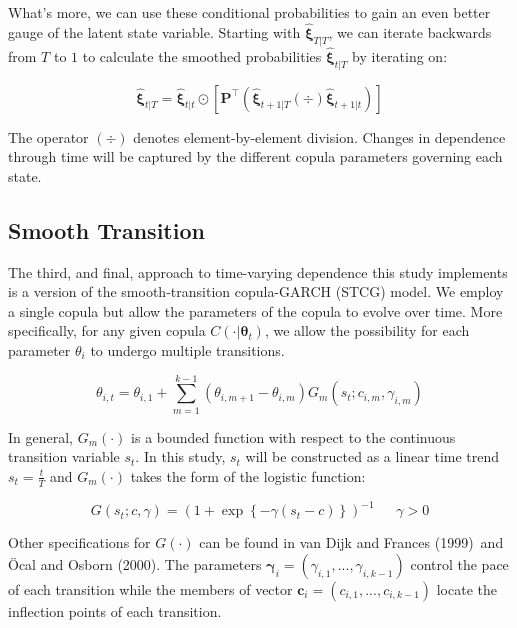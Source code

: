 \documentclass[12pt]{article}
\newcommand{\boldXi}{\hat{\boldsymbol{\xi}}}
\begin{document}
What's more, we can use these conditional probabilities to gain an even better gauge of the latent state variable. Starting with $\boldXi_{T|T}$, we can iterate backwards from $T$ to $1$ to calculate the smoothed probabilities $\boldXi_{t|T}$ by iterating on:

\begin{equation}
\boldXi_{t|T} = \boldXi_{t|t} \odot \left[\mathbf{P}^{\top}\left(\boldXi_{t+1|T}\left(\div\right)\boldXi_{t+1|t}\right)\right]
\end{equation}

The operator $\left(\div\right)$ denotes element-by-element division. Changes in dependence through time will be captured by the different copula parameters governing each state.

\subsection{Smooth Transition}

The third, and final, approach to time-varying dependence this study implements is a version of the smooth-transition copula-GARCH (STCG) model. We employ a single copula but allow the parameters of the copula to evolve over time. More specifically, for any given copula $C\left(\cdot | \mathbf{\theta}_{t}\right)$, we allow the possibility for each parameter $\theta
_{i}$ to undergo multiple transitions.

\begin{equation} \label{eqn:smoothTrans}
\theta_{i,t} = \theta_{i,1} + \sum_{m=1}^{k-1}\left(\theta_{i,m+1} - \theta_{i,m}\right) G_{m}\left(s_{t}; c_{i,m},\gamma_{i,m}\right)
\end{equation}

In general, $G_{m}\left(\cdot\right)$ is a bounded function with respect to the continuous transition variable $s_{t}$. In this study, $s_{t}$ will be constructed as a linear time trend $s_{t}=\frac{t}{T}$ and $G_{m}\left(\cdot\right)$ takes the form of the logistic function:

\begin{equation} \label{eqn:smoothTransLogit}
G\left(s_{t}; c, \gamma\right) = \left(1+\exp\left\{ -\gamma \left(
s_{t}-c\right) \right\}\right)^{-1}~~~~~~~\gamma > 0
\end{equation}

Other specifications for $G\left( \cdot \right) $ can be found in van Dijk and Frances (1999)\ and \"{O}cal and Osborn (2000). The parameters $\boldsymbol{\gamma}_{i} = \left(\gamma_{i,1},...,\gamma_{i,k-1}\right)$ control the pace of each transition while the members of vector $\mathbf{c}_{i} = \left(c_{i,1},...,c_{i,k-1}\right)$ locate the inflection points of each transition.
\end{document}
